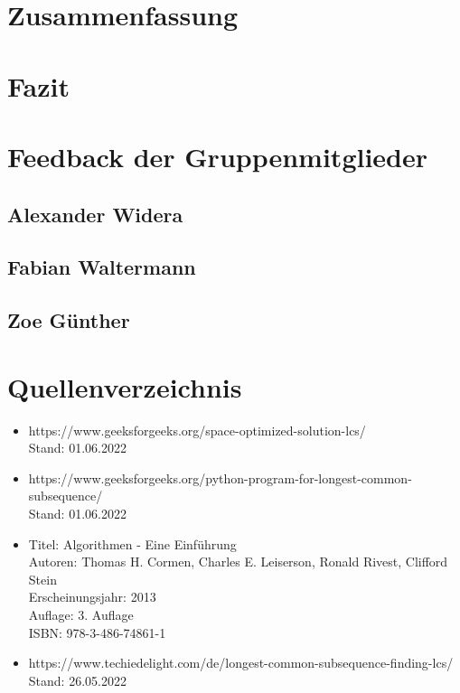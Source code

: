 \documentclass[a4paper,12pt]{scrartcl}
\begin{document}
\section{Zusammenfassung}
\section{Fazit}

\section{Feedback der Gruppenmitglieder}
\subsection{Alexander Widera}
\subsection{Fabian Waltermann}
\subsection{Zoe Günther}

\newpage
\section{Quellenverzeichnis}
\begin{itemize}
\item https://www.geeksforgeeks.org/space-optimized-solution-lcs/ \\ Stand: 01.06.2022
\item https://www.geeksforgeeks.org/python-program-for-longest-common-subsequence/ \\ Stand: 01.06.2022
\item Titel: Algorithmen - Eine Einführung \\ Autoren: Thomas H. Cormen, Charles E. Leiserson, Ronald Rivest, Clifford Stein \\ Erscheinungsjahr: 2013 \\ Auflage: 3. Auflage \\ ISBN: 978-3-486-74861-1
\item https://www.techiedelight.com/de/longest-common-subsequence-finding-lcs/ \\ Stand: 26.05.2022
\end{itemize}
\end{document}
